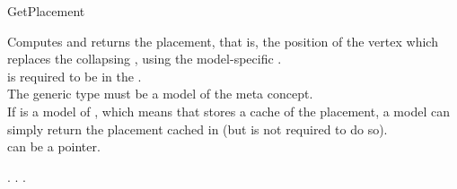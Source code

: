 \begin{ccRefConcept}{GetPlacement}

\ccOperations

  {Computes and returns the placement, that is, the position of the vertex which replaces the collapsing ,
   using the model-specific .\\
    is required to be in the .\\
   The generic type  must be a model of the  meta concept.\\
   If  is a model of , which means that
    stores a cache of the placement, a model can simply return the placement cached
   in  (but is not required to do so).\\
    can be a  pointer.
  }
  
\ccHasModels
{}.
.
.

\end{ccRefConcept}

